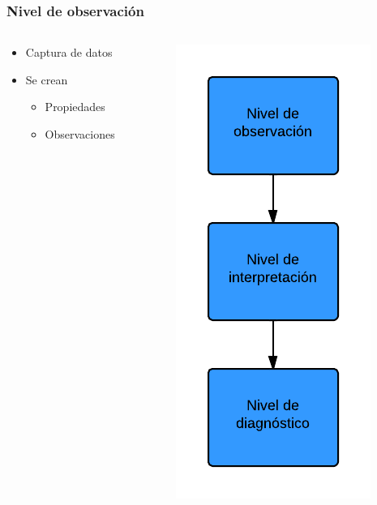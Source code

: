 \begin{frame}
	\frametitle{Nivel de observaci\'on}
	
	\begin{columns}[T] %
		\begin{column}[T]{5cm} %
			\begin{itemize}
				\item Captura de datos
				\item Se crean
				\begin{itemize}
					\item Propiedades
					\item Observaciones
				\end{itemize}
			\end{itemize}
		\end{column}
		\begin{column}[T]{5cm} %
			\includegraphics[height=1.0\linewidth]{../Figures/Proceso.png}
		\end{column}
	\end{columns}
\end{frame}